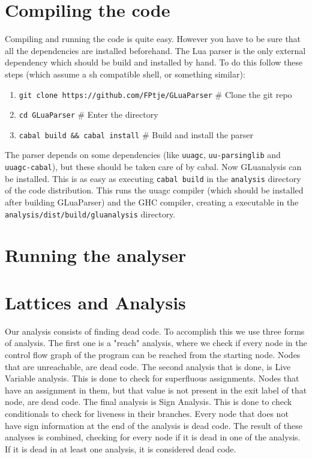 \documentclass[10pt]{article}
\begin{document}
\section{Compiling the code}
Compiling and running the code is quite easy. However you have to be sure that all the dependencies are installed beforehand. The Lua parser is the only external dependency which should be build and installed by hand. To do this follow these steps (which assume a sh compatible shell, or something similar):

\begin{enumerate}
	\item \texttt{git clone https://github.com/FPtje/GLuaParser} \# Clone the git repo
	\item \texttt{cd GLuaParser} \# Enter the directory
	\item \texttt{cabal build \&\& cabal install} \# Build and install the parser
\end{enumerate}

The parser depends on some dependencies (like \texttt{uuagc}, \texttt{uu-parsinglib} and \texttt{uuagc-cabal}), but these should be taken care of by cabal. Now GLuanalysis can be installed. This is as easy as executing \texttt{cabal build} in the \texttt{analysis} directory of the code distribution. This runs the uuagc compiler (which should be installed after building GLuaParser) and the GHC compiler, creating a executable in the \texttt{analysis/dist/build/gluanalysis} directory.

\section{Running the analyser}


\section{Lattices and Analysis}
Our analysis consists of finding dead code. To accomplish this we use three forms of analysis. The first one is a "reach" analysis, where we check if every node in the control flow graph of the program can be reached from the starting node. Nodes that are unreachable, are dead code.
The second analysis that is done, is Live Variable analysis. This is done to check for superfluous assignments. Nodes that have an assignment in them, but that value is not present in the exit label of that node, are dead code.
The final analysis is Sign Analysis. This is done to check conditionals to check for liveness in their branches. Every node that does not have sign information at the end of the analysis is dead code.
The result of these analyses is combined, checking for every node if it is dead in one of the analysis. If it is dead in at least one analysis, it is considered dead code.
\end{document}
